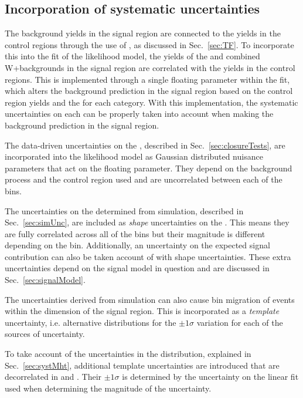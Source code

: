 \subsection{Incorporation of systematic uncertainties}

The background yields in the signal region are connected to the yields
in the control regions through the use of \TFs, as discussed in
Sec.~\ref{sec:TF}. To incorporate this into the fit of the likelihood
model, the yields of the \znunu and combined W+\ttbar backgrounds in
the signal region are correlated with the yields in the control
regions. This is implemented through a single floating parameter
within the fit, which alters the background prediction in the signal
region based on the control region yields and the \TF for each
category. With this implementation, the systematic uncertainties on
each \TF can be properly taken into account when making the background
prediction in the signal region. 

The data-driven uncertainties on the \TFs, described in
Sec.~\ref{sec:closureTests}, are incorporated into the likelihood
model as Gaussian distributed nuisance parameters that act on the
floating parameter. They depend on the background process and the
control region used and are uncorrelated between each of the \htcat
bins.

The uncertainties on the \TFs determined from simulation, described in
Sec.~\ref{sec:simUnc}, are included as \emph{shape} uncertainties on
the \TFs. This means they are fully correlated across all of the
\htcat bins but their magnitude is different depending on the bin. 
Additionally, an uncertainty on the expected signal contribution can
also be taken account of with shape uncertainties. These extra
uncertainties depend on the signal model in question and are discussed
in Sec.~\ref{sec:signalModel}.

The uncertainties derived from simulation can also cause bin migration
of events within the \MHT dimension of the signal region. This is
incorporated as a \emph{template} uncertainty, i.e. alternative \MHT
distributions for the $\pm1\sigma$ variation for each of the sources
of uncertainty. 

To take account of the uncertainties in the \MHT
distribution, explained in Sec.~\ref{sec:systMht}, additional template
uncertainties are introduced that are decorrelated in \nj and \HT.
Their $\pm1\sigma$ is determined by the uncertainty on the linear fit
used when determining the magnitude of the \MHT uncertainty.

